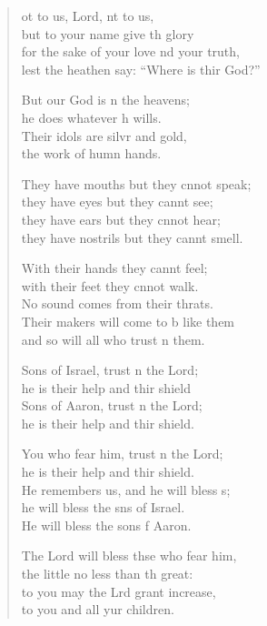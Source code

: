 \begin{verse}
  \begin{patverse}
ot to us, Lord, nt to us,\Med\\
but to your name give th glory\\
for the sake of your love nd your truth,\Med\\
lest the heathen say: “Where is thir God?”

But our God is \pointup{\i}n the heavens;\Med\\
he does whatever h wills.\\
Their idols are silvr and gold,\Med\\
the work of humn hands.

They have mouths but they cnnot speak;\Med\\
they have eyes but they cannt see;\\
they have ears but they cnnot hear;\Med\\
they have nostrils but they cannt smell.

With their hands they cannt feel;\Flex\\
with their feet they cnnot walk.\Med\\
No sound comes from their thrats.\\
Their makers will come to b like them\Med\\
and so will all who trust \pointup{\i}n them.

Sons of Israel, trust \pointup{\i}n the Lord;\Med\\
he is their help and thir shield\\
Sons of Aaron, trust \pointup{\i}n the Lord;\Med\\
he is their help and thir shield.

You who fear him, trust \pointup{\i}n the Lord;\Med\\
he is their help and thir shield.\\
He remembers us, and he will bless s;\Flex\\
he will bless the sns of Israel.\Med\\
He will bless the sons f Aaron.

The Lord will bless thse who fear him,\Med\\
the little no less than th great:\\
to you may the Lrd grant increase,\Med\\
to you and all yur children.


\end{patverse}
\end{verse}
